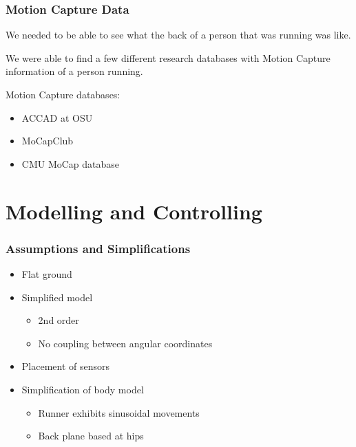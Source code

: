 \documentclass[dvipsnames,usenames]{beamer}
\begin{document}
\begin{frame}
\frametitle{Motion Capture Data}  

We needed to be able to see what the back of a person that was running
was like.  

\vspace{1em}
We were able to find a few different research databases with Motion
Capture information of a person running.

\vspace{1em}
Motion Capture databases:
\begin{itemize}
\item ACCAD at OSU
\item MoCapClub
\item CMU MoCap database
\end{itemize}
\end{frame}

\section{Modelling and Controlling}
\begin{frame}
\frametitle{Assumptions and Simplifications}

\begin{itemize}
\item Flat ground
\vspace{1em}
\item Simplified model
\begin{itemize}
\item 2nd order
\item No coupling between angular coordinates
\end{itemize}
\vspace{1em}
\item Placement of sensors
\vspace{1em}
\item Simplification of body model
\begin{itemize}
\item Runner exhibits sinusoidal movements
\item Back plane based at hips
\end{itemize}
\end{itemize}

\end{frame}
\end{document}

